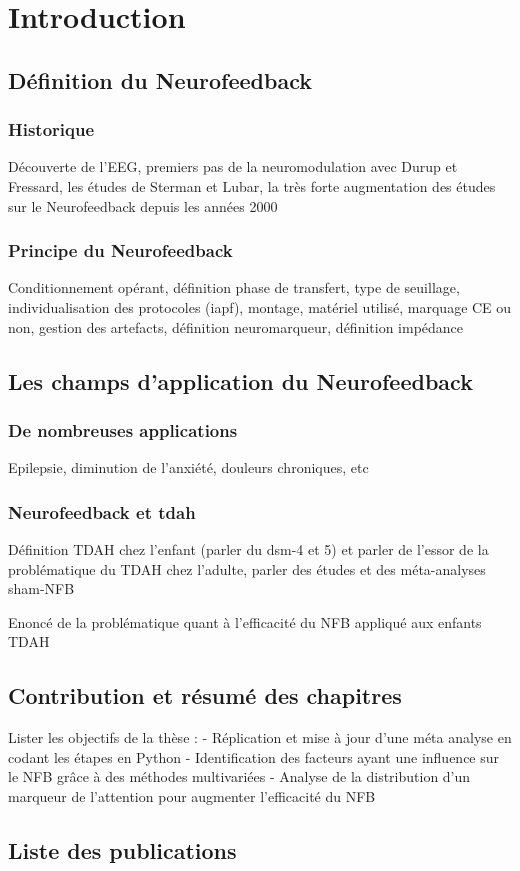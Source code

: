 \chapter{Introduction}


\section{Définition du Neurofeedback}

\subsection{Historique}
Découverte de l’EEG, premiers pas de la neuromodulation avec Durup 
et Fressard, les études de Sterman et Lubar, la très forte augmentation des études sur le Neurofeedback depuis 
les années 2000

\subsection{Principe du Neurofeedback}
Conditionnement opérant, définition phase de transfert, type de seuillage, individualisation des protocoles (iapf), 
montage, matériel utilisé, marquage CE ou non, gestion des artefacts, définition neuromarqueur, définition impédance

\section{Les champs d'application du Neurofeedback}

\subsection{De nombreuses applications}
Epilepsie, diminution de l’anxiété, douleurs chroniques, etc

\subsection{Neurofeedback et \gls{tdah}}
Définition TDAH chez l’enfant (parler du dsm-4 et 5) et parler de l’essor de la problématique du TDAH chez l’adulte, parler des études et des méta-analyses
sham-NFB

Enoncé de la problématique quant à l’efficacité du NFB appliqué aux enfants TDAH

\section{Contribution et résumé des chapitres}
Lister les objectifs de la thèse :
- Réplication et mise à jour d’une méta analyse en codant les étapes en Python
- Identification des facteurs ayant une influence sur le NFB grâce à des méthodes multivariées
- Analyse de la distribution d’un marqueur de l’attention pour augmenter l’efficacité du NFB

\section{Liste des publications}